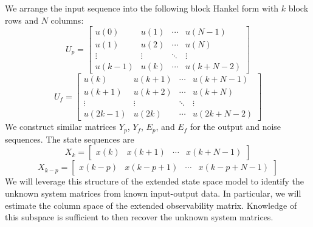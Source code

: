 We arrange the input sequence into the following block Hankel form with $k$ block rows and $N$ columns:
\begin{equation*}
U_p = \begin{bmatrix}
u(0) & u(1) & \cdots & u(N-1)\\
u(1) & u(2) & \cdots & u(N)\\
\vdots & \vdots & \ddots & \vdots\\
u(k-1) & u(k) & \cdots & u(k+N-2)
\end{bmatrix}
\end{equation*}
\begin{equation*}
U_f = \begin{bmatrix}
u(k) & u(k+1) & \cdots & u(k+N-1)\\
u(k+1) & u(k+2) & \cdots & u(k+N)\\
\vdots & \vdots & \ddots & \vdots\\
u(2k-1) & u(2k) & \cdots & u(2k+N-2)
\end{bmatrix}
\end{equation*}
We construct similar matrices $Y_p$, $Y_f$, $E_p$, and $E_f$ for the output and noise sequences. The state sequences are
\begin{equation*}
X_k = \begin{bmatrix}
x(k) & x(k+1) & \cdots & x(k+N-1)
\end{bmatrix}
\end{equation*}
\begin{equation*}
X_{k-p} = \begin{bmatrix}
x(k-p) & x(k-p+1) & \cdots & x(k-p+N-1)
\end{bmatrix}
\end{equation*}
We will leverage this structure of the extended state space model to identify the unknown system matrices from known input-output data. In particular, we will estimate the column space of the extended observability matrix. Knowledge of this subspace is sufficient to then recover the unknown system matrices. 


